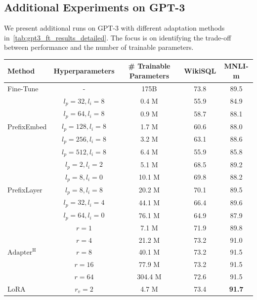 \documentclass{article} %
\begin{document}
\subsection{Additional Experiments on GPT-3}
\label{app:gpt3_extra}
We present additional runs on GPT-3 with different adaptation methods in~\autoref{tab:gpt3_ft_results_detailed}.
The focus is on identifying the trade-off between performance and the number of trainable parameters.
\begin{table}[h]
\centering
\begin{tabular}{l|c|c|c|c}
\hline
\toprule
Method    & Hyperparameters & \# Trainable Parameters &  WikiSQL & MNLI-m \\
\midrule
Fine-Tune & - & 175B &  73.8 & 89.5 \\
\midrule
\multirow{5}{*}{PrefixEmbed} & $l_p=32, l_i=8$ & 0.4 M & 55.9 & 84.9 \\
                             & $l_p=64, l_i=8$ & 0.9 M & 58.7 & 88.1 \\
                             & $l_p=128, l_i=8$ & 1.7 M & 60.6 & 88.0 \\
                             & $l_p=256, l_i=8$ & 3.2 M & 63.1 & 88.6 \\
                             & $l_p=512, l_i=8$ & 6.4 M & 55.9 & 85.8 \\
\midrule
\multirow{5}{*}{PrefixLayer} 
                             & $l_p=2, l_i=2$ & 5.1 M & 68.5 & 89.2 \\
                             & $l_p=8, l_i=0$ & 10.1 M & 69.8 & 88.2 \\
                             & $l_p=8, l_i=8$ & 20.2 M & 70.1 & 89.5 \\
                             & $l_p=32, l_i=4$ & 44.1 M & 66.4 & 89.6 \\
                             & $l_p=64, l_i=0$ & 76.1 M & 64.9 & 87.9 \\
\midrule
\multirow{5}{*}{$\text{Adapter}^{\text{H}}$} 
                             & $r=1$ & 7.1 M & 71.9 & 89.8 \\
                             & $r=4$ & 21.2 M & 73.2 & 91.0 \\
                             & $r=8$ & 40.1 M & 73.2 & 91.5 \\
                             & $r=16$& 77.9 M & 73.2 & 91.5 \\
                             & $r=64$& 304.4 M & 72.6 & 91.5 \\
\midrule
\multirow{5}{*}{LoRA}        & $r_{v}=2 $ & 4.7 M & 73.4 & \textbf{91.7} \\

\end{tabular}
\end{table}
\end{document}
